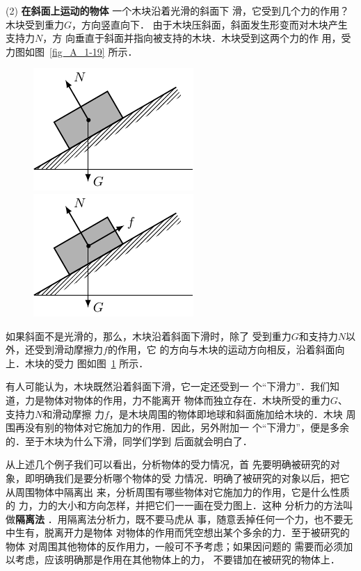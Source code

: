     (2) \textbf{在斜面上运动的物体 }  一个木块沿着光滑的斜面下
滑，它受到几个力的作用？木块受到重力$G$，方向竖直向下．
由于木块压斜面，斜面发生形变而对木块产生支持力$N$，方
向垂直于斜面并指向被支持的木块．木块受到这两个力的作
用，受力图如图~\ref{fig_A_1-19} 所示．

\begin{figure} [htp]\centering
	\begin{minipage} [t]{0.48\textwidth} 
		\centering
		\includegraphics{fig/A/1-19.pdf} 
		\caption{} \label{fig_A_1-19} 
	\end{minipage} 
	\begin{minipage} [t]{0.48\textwidth} 
		\centering
		\includegraphics{fig/A/1-20.pdf} 
		\caption{} \label{fig_A_1-20} 
	\end{minipage} 
\end{figure} 


    如果斜面不是光滑的，那么，木块沿着斜面下滑时，除了
受到重力$G$和支持力$N$以外，还受到滑动摩擦力$f$的作用，它
的方向与木块的运动方向相反，沿着斜面向上．木块的受力
图如图~\ref{fig_A_1-20} 所示．


有人可能认为，木块既然沿着斜面下滑，它一定还受到一
个“下滑力”．我们知道，力是物体对物体的作用，力不能离开
物体而独立存在．木块所受的重力$G$、支持力$N$和滑动摩擦
力$f$，是木块周围的物体即地球和斜面施加给木块的．木块
周围再没有别的物体对它施加力的作用．因此，另外附加一
个“下滑力”，便是多余的．至于木块为什么下滑，同学们学到
后面就会明白了．

    从上述几个例子我们可以看出，分析物体的受力情况，首
先要明确被研究的对象，即明确我们是要分析哪个物体的受
力情况．明确了被研究的对象以后，把它从周围物体中隔离出
来，分析周围有哪些物体对它施加力的作用，它是什么性质的
力，力的大小和方向怎样，并把它们一一画在受力图上．这种
分析力的方法叫做\textbf{隔离法} ．用隔离法分析力，既不要马虎从
事，随意丢掉任何一个力，也不要无中生有，脱离开力是物体
对物体的作用而凭空想出某个多余的力．至于被研究的物体
对周围其他物体的反作用力，一般可不予考虑；如果因问题的
需要而必须加以考虑，应该明确那是作用在其他物体上的力，
不要错加在被研究的物体上．

